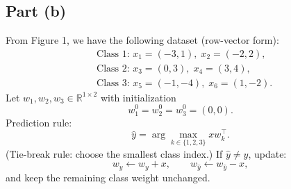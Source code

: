 \documentclass[fleqn]{article}
\begin{document}
    \subsection{Part (b)}
    From Figure 1, we have the following dataset (row-vector form):
    \[
    \begin{aligned}
        &\text{Class 1: } x_1=(-3,1),\; x_2=(-2,2),\\
        &\text{Class 2: } x_3=(0,3),\; x_4=(3,4),\\
        &\text{Class 3: } x_5=(-1,-4),\; x_6=(1,-2).
    \end{aligned}
    \]
    Let $w_1,w_2,w_3\in\mathbb{R}^{1\times 2}$ with initialization
    \[
        w_1^0=w_2^0=w_3^0=(0,0).
    \]
    Prediction rule:
    \[
        \hat y=\arg\max_{k\in\{1,2,3\}} xw_k^\top.
    \]
    (Tie-break rule: choose the smallest class index.)  
    If $\hat y\neq y$, update:
    \[
        w_y \leftarrow w_y + x,\qquad
        w_{\hat y} \leftarrow w_{\hat y} - x,
    \]
    and keep the remaining class weight unchanged.
\end{document}
